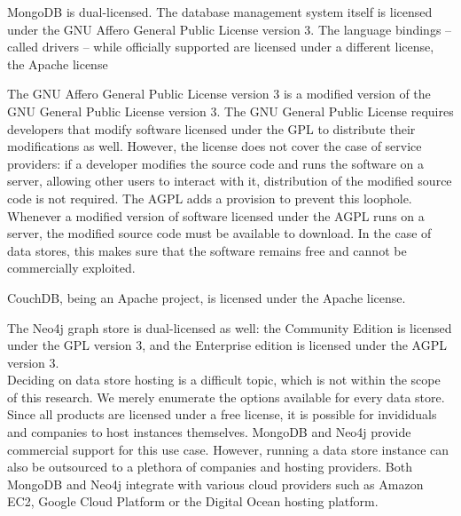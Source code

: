 MongoDB is dual-licensed.
The database management system itself is licensed under the GNU Affero General Public License version 3.
The language bindings -- called drivers -- while officially supported are licensed under a different license, the Apache license

The GNU Affero General Public License version 3 is a modified version of the GNU General Public License version 3.
The GNU General Public License requires developers that modify software licensed under the GPL to distribute their modifications as well.
However, the license does not cover the case of service providers: if a developer modifies the source code and runs the software on a server, allowing other users to interact with it, distribution of the modified source code is not required.
The AGPL adds a provision to prevent this loophole.
Whenever a modified version of software licensed under the AGPL runs on a server, the modified source code must be available to download.
In the case of data stores, this makes sure that the software remains free and cannot be commercially exploited.

CouchDB, being an Apache project, is licensed under the Apache license.

The Neo4j graph store is dual-licensed as well: the Community Edition is licensed under the GPL version 3, and the Enterprise edition is licensed under the AGPL version 3.\\
Deciding on data store hosting is a difficult topic, which is not within the scope of this research.
We merely enumerate the options available for every data store.
Since all products are licensed under a free license, it is possible for invididuals and companies to host instances themselves.
MongoDB and Neo4j provide commercial support for this use case.
However, running a data store instance can also be outsourced to a plethora of companies and hosting providers.
Both MongoDB and Neo4j integrate with various cloud providers such as Amazon EC2, Google Cloud Platform or the Digital Ocean hosting platform.\\

